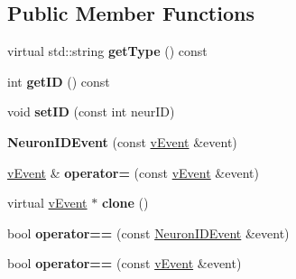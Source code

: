 \subsection*{Public Member Functions}
\begin{DoxyCompactItemize}
\item 
virtual std\+::string {\bfseries get\+Type} () const \hypertarget{classev_1_1NeuronIDEvent_a71548e0a5b42fb693050da5f615e83fd}{}\label{classev_1_1NeuronIDEvent_a71548e0a5b42fb693050da5f615e83fd}

\item 
int {\bfseries get\+ID} () const \hypertarget{classev_1_1NeuronIDEvent_ae86cefbe2983c8793c3509e620b44036}{}\label{classev_1_1NeuronIDEvent_ae86cefbe2983c8793c3509e620b44036}

\item 
void {\bfseries set\+ID} (const int neur\+ID)\hypertarget{classev_1_1NeuronIDEvent_ad843c27bca4d310819f3cf756b29089d}{}\label{classev_1_1NeuronIDEvent_ad843c27bca4d310819f3cf756b29089d}

\item 
{\bfseries Neuron\+I\+D\+Event} (const \hyperlink{classev_1_1vEvent}{v\+Event} \&event)\hypertarget{classev_1_1NeuronIDEvent_a6b08dbb4ac55a13528f6f43e7259987f}{}\label{classev_1_1NeuronIDEvent_a6b08dbb4ac55a13528f6f43e7259987f}

\item 
\hyperlink{classev_1_1vEvent}{v\+Event} \& {\bfseries operator=} (const \hyperlink{classev_1_1vEvent}{v\+Event} \&event)\hypertarget{classev_1_1NeuronIDEvent_a705884450f2883b6398ef8608fb33c37}{}\label{classev_1_1NeuronIDEvent_a705884450f2883b6398ef8608fb33c37}

\item 
virtual \hyperlink{classev_1_1vEvent}{v\+Event} $\ast$ {\bfseries clone} ()\hypertarget{classev_1_1NeuronIDEvent_aa0054775d211f072cd0aec353fb7ef1a}{}\label{classev_1_1NeuronIDEvent_aa0054775d211f072cd0aec353fb7ef1a}

\item 
bool {\bfseries operator==} (const \hyperlink{classev_1_1NeuronIDEvent}{Neuron\+I\+D\+Event} \&event)\hypertarget{classev_1_1NeuronIDEvent_a5478799d323fc588787aef446ddca511}{}\label{classev_1_1NeuronIDEvent_a5478799d323fc588787aef446ddca511}

\item 
bool {\bfseries operator==} (const \hyperlink{classev_1_1vEvent}{v\+Event} \&event)\hypertarget{classev_1_1NeuronIDEvent_a4d105c1883a059e54a9c270e9b1fa687}{}\label{classev_1_1NeuronIDEvent_a4d105c1883a059e54a9c270e9b1fa687}


\end{DoxyCompactItemize}
